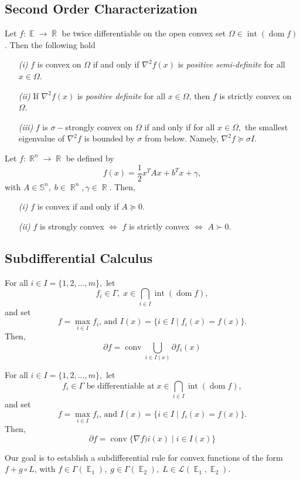 \documentclass{tufte-handout}
\DeclareMathOperator{\dom}{dom}
\DeclareMathOperator{\R}{\mathbb{R}}
\DeclareMathOperator{\E}{\mathbb{E}}
\DeclareMathOperator{\conv}{conv}
\begin{document}
{{\subsection{Second Order Characterization}%
  \label{sub:Second Order Characterization}
  \begin{theorem} 
    Let $f: \E \to \overline{\R}$ be twice differentiable on the open convex set $\Omega \in \operatorname{int}(\dom f)$. Then the following hold
    \begin{enumerate}
      \item[\it (i)] $f$ is convex on $\Omega$ if and only if $\nabla^2 f(x)$ is \textit{positive semi-definite} for all $x \in \Omega.$ 
      \item[\it (ii)] If $\nabla^2 f(x)$ is \textit{positive definite} for all $x \in \Omega $, then $f$ is strictly convex on $\Omega.$ 
      \item[\it (iii)] $f$ is $\sigma-$strongly convex on $\Omega $ if and only if for all $x \in \Omega, $ the smallest eigenvalue of $\nabla^2 f$ is bounded by $\sigma$ from below. Namely, $\nabla^2 f \succeq \sigma I.$ 
    \end{enumerate}
  \end{theorem}
\begin{corollary}
  Let $f : \R^n \to \R$ be defined by 
  $$f (x) = \frac{1}{2} x^T A x + b^Tx + \gamma ,$$
  with $A \in \mathbb{S}^n, \; b\in \R^n, \gamma \in \R $. Then, 
  \begin{enumerate}
    \item[\it (i)] $f$ is convex if and only if $A \succeq 0$.  
    \item[\it (ii)] $f$ is strongly convex $\iff$ $f$ is strictly convex $\iff $ $A \succ 0.$ 
  \end{enumerate}
\end{corollary}
\subsection{Subdifferential Calculus}%
  \label{sub:Subdifferential Calculus}
 \begin{theorem} \label{label}
   For all $i \in I = \{1, 2, ..., m\},$ let $$f_i \in \Gamma, \; x \in \bigcap_{i \in I}\operatorname{int} (\dom f),$$ and set $$f  = \max_{i \in I} f_i\text{, and } I(x) = \{i\in I \mid f_i(x) = f(x)\}.$$
   Then, $$\partial f = \conv \bigcup_{i \in I (x) } \partial f_i(x) $$
 \end{theorem} 
 \begin{corollary}
   For all $i \in I = \{1, 2, ..., m\},$ let $$f_i \in \Gamma \text{ be differentiable at} \; x \in \bigcap_{i \in I}\operatorname{int} (\dom f),$$ and set $$f  = \max_{i \in I} f_i\text{, and } I(x) = \{i\in I \mid f_i(x) = f(x)\}.$$
   Then, $$\partial f = \conv \{ \nabla f)i(x) \mid i \in I(x) \} $$
 \end{corollary}
 Our goal is to establish a subdifferential rule for convex functions of the
form $f + g\circ L$, with $f \in \Gamma(\E_1), \; g \in \Gamma(\E_2), \; L \in \mathcal{L}(\E_1 , \E_2)$.

}}
\end{document}
